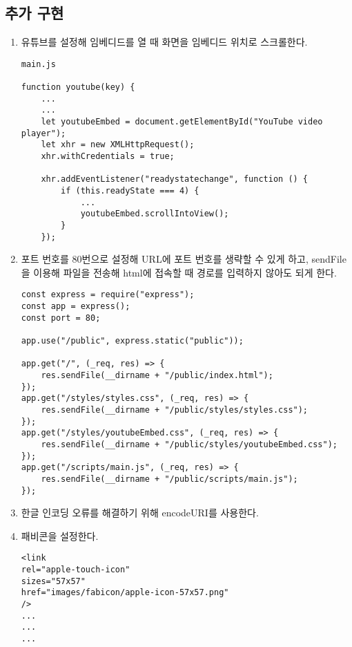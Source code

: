 \documentclass[a4paper, titlepage]{article}
\begin{document}
\subsection{추가 구현}
\begin{enumerate}
    \item 유튜브를 설정해 임베디드를 열 때 화면을 임베디드 위치로 스크롤한다.
          \begin{verbatim}
main.js

function youtube(key) {
    ...
    ...
    let youtubeEmbed = document.getElementById("YouTube video player");
    let xhr = new XMLHttpRequest();
    xhr.withCredentials = true;

    xhr.addEventListener("readystatechange", function () {
        if (this.readyState === 4) {
            ...
            youtubeEmbed.scrollIntoView();
        }
    });
    \end{verbatim}

    \item 포트 번호를 80번으로 설정해 URL에 포트 번호를 생략할 수 있게 하고, sendFile을 이용해 파일을 전송해 html에 접속할 때 경로를 입력하지 않아도 되게 한다.
          \begin{verbatim}
const express = require("express");
const app = express();
const port = 80;

app.use("/public", express.static("public"));

app.get("/", (_req, res) => {
    res.sendFile(__dirname + "/public/index.html");
});
app.get("/styles/styles.css", (_req, res) => {
    res.sendFile(__dirname + "/public/styles/styles.css");
});
app.get("/styles/youtubeEmbed.css", (_req, res) => {
    res.sendFile(__dirname + "/public/styles/youtubeEmbed.css");
});
app.get("/scripts/main.js", (_req, res) => {
    res.sendFile(__dirname + "/public/scripts/main.js");
});
    \end{verbatim}

    \item 한글 인코딩 오류를 해결하기 위해 encodeURI를 사용한다.
    \item 패비콘을 설정한다.
          \begin{verbatim}
<link
rel="apple-touch-icon"
sizes="57x57"
href="images/fabicon/apple-icon-57x57.png"
/>
...
...
...
    \end{verbatim}
\end{enumerate}
\end{document}
